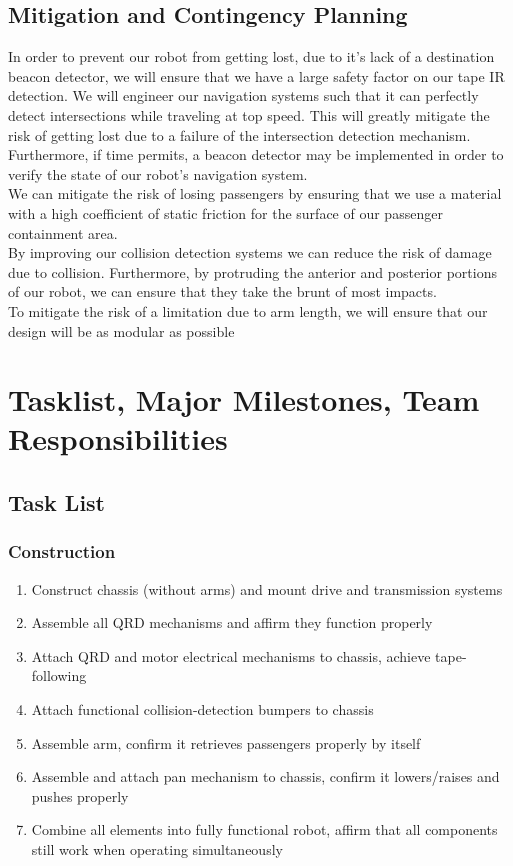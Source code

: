 \documentclass[12pt]{article}
\begin{document}
\subsection{Mitigation and Contingency Planning}
In order to prevent our robot from getting lost, due to it’s lack of a
destination beacon detector, we will ensure that we have a large safety factor
on our tape IR detection. We will engineer our navigation systems such that it
can perfectly detect intersections while traveling at top speed. This will
greatly mitigate the risk of getting lost due to a failure of the intersection
detection mechanism. \\

Furthermore, if time permits, a beacon detector may be implemented in order to
verify the state of our robot’s navigation system.\\

We can mitigate the risk of losing passengers by ensuring that  we use a
material with a high coefficient of static friction for the surface of our
passenger containment area. \\

By improving our collision detection systems we can reduce the risk of damage
due to collision. Furthermore, by protruding the anterior and posterior portions
of our robot, we can ensure that they take the brunt of most impacts.\\

To mitigate the risk of a limitation due to arm length, we will ensure that our
design will be as modular as possible
\section{Tasklist, Major Milestones, Team Responsibilities}
\subsection{Task List}
\subsubsection{Construction}
\begin{enumerate}
\item Construct chassis (without arms) and mount drive and transmission systems
\item Assemble all QRD mechanisms and affirm they function properly
\item Attach QRD and motor electrical mechanisms to chassis, achieve
tape-following
\item  Attach functional collision-detection bumpers to chassis
\item Assemble arm, confirm it retrieves passengers properly by itself
\item Assemble and attach pan mechanism to chassis, confirm it lowers/raises and
pushes properly 
\item Combine all elements into fully functional robot, affirm
that all components still work when operating simultaneously
\end{enumerate}
\end{document}
